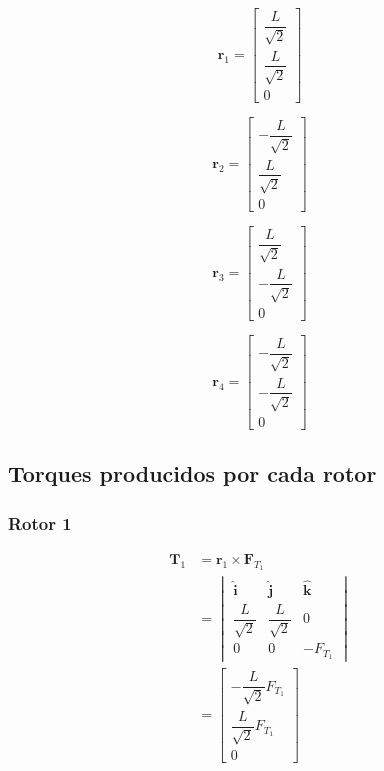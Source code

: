 \documentclass[11pt,a4paper]{article}
\begin{document}
\begin{equation}
\mathbf{r}_1 =
\begin{bmatrix}
\dfrac{L}{\sqrt{2}} \\
\dfrac{L}{\sqrt{2}} \\
0
\end{bmatrix}
\end{equation}

\begin{equation}
\mathbf{r}_2 =
\begin{bmatrix}
-\dfrac{L}{\sqrt{2}} \\
\dfrac{L}{\sqrt{2}} \\
0
\end{bmatrix}
\end{equation}

\begin{equation}
\mathbf{r}_3 =
\begin{bmatrix}
\dfrac{L}{\sqrt{2}} \\
-\dfrac{L}{\sqrt{2}} \\
0
\end{bmatrix}
\end{equation}

\begin{equation}
\mathbf{r}_4 =
\begin{bmatrix}
-\dfrac{L}{\sqrt{2}} \\
-\dfrac{L}{\sqrt{2}} \\
0
\end{bmatrix}
\end{equation}


\subsection{Torques producidos por cada rotor}

\subsubsection{Rotor 1}

\begin{align}
\mathbf{T}_1
&= \mathbf{r}_1 \times \mathbf{F}_{T_1} \\[2mm]
&=
\begin{vmatrix}
\hat{\mathbf{i}} & \hat{\mathbf{j}} & \hat{\mathbf{k}} \\
\dfrac{L}{\sqrt{2}} & \dfrac{L}{\sqrt{2}} & 0 \\
0 & 0 & -F_{T_1}
\end{vmatrix} \\[3mm]
&=
\begin{bmatrix}
-\dfrac{L}{\sqrt{2}}F_{T_1} \\
\dfrac{L}{\sqrt{2}}F_{T_1} \\
0
\end{bmatrix}
\end{align}
\end{document}
